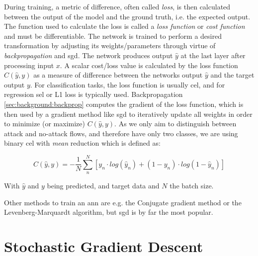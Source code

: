 
During training, a metric of difference, often called \textit{loss}, is then calculated between the output of the model and the ground truth, i.e. the expected output. The function used to calculate the loss is called a \textit{loss function} or \textit{cost function} and must be differentiable. The network is trained to perform a desired transformation by adjusting its weights/parameters through virtue of \textit{backpropagation} and \gls{sgd}. The network produces output $\hat{y}$ at the last layer after processing input $x$. A scalar cost/loss value is calculated by the loss function $C(\hat{y}, y)$ as a measure of difference between the networks output $\hat{y}$ and the target output $y$. For classification tasks, the loss function is usually \gls{cel}, and for regression \gls{sel} or L1 loss is typically used. Backpropagation \ref{sec:background:backprop} computes the gradient of the loss function, which is then used by a gradient method like \gls{sgd} to iteratively update all weights in order to minimize (or maximize) $C(\hat{y}, y)$. As we only aim to distinguish between attack and no-attack flows, and therefore have only two classes, we are using binary \gls{cel} with \textit{mean} reduction which is defined as:

\begin{equation}
C(\hat{y},y) = -\frac{1}{N}\sum_n^{N}[y_n \cdot log(\hat{y}_n) + (1-y_n) \cdot log(1-\hat{y}_n)]
\end{equation}

With $\hat{y}$ and $y$ being predicted, and target data and $N$ the batch size.

Other methods to train an \gls{ann} are e.g. the Conjugate gradient method or the Levenberg-Marquardt algorithm, but \gls{sgd} is by far the most popular.

\section{Stochastic Gradient Descent} \label{sec:background:sgd}

